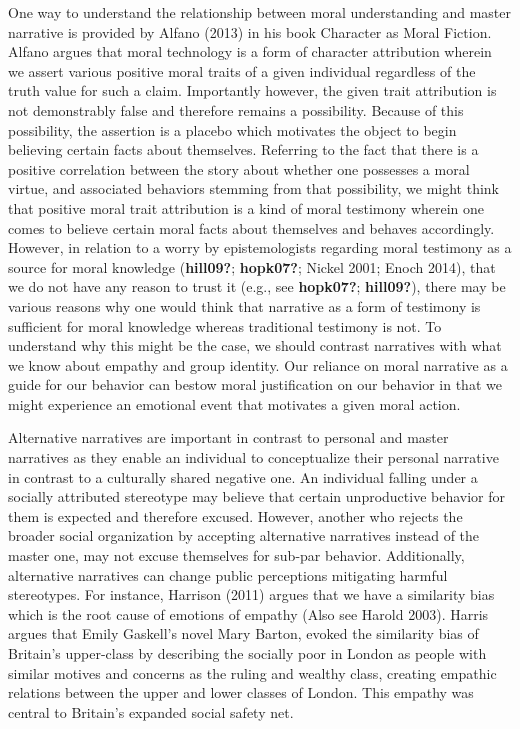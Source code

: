 \documentclass[12pt]{book}
\theoremstyle{definition}
\theoremstyle{remark}
\begin{document}
One way to understand the relationship between moral understanding and master narrative is provided by Alfano (2013) in his book Character as Moral Fiction. Alfano argues that moral technology is a form of character attribution wherein we assert various positive moral traits of a given individual regardless of the truth value for such a claim. Importantly however, the given trait attribution is not demonstrably false and therefore remains a possibility. Because of this possibility, the assertion is a placebo which motivates the object to begin believing certain facts about themselves. Referring to the fact that there is a positive correlation between the story about whether one possesses a moral virtue, and associated behaviors stemming from that possibility, we might think that positive moral trait attribution is a kind of moral testimony wherein one comes to believe certain moral facts about themselves and behaves accordingly. However, in relation to a worry by epistemologists regarding moral testimony as a source for moral knowledge (\textbf{hill09?}; \textbf{hopk07?}; Nickel 2001; Enoch 2014), that we do not have any reason to trust it (e.g., see \textbf{hopk07?}; \textbf{hill09?}), there may be various reasons why one would think that narrative as a form of testimony is sufficient for moral knowledge whereas traditional testimony is not. To understand why this might be the case, we should contrast narratives with what we know about empathy and group identity. Our reliance on moral narrative as a guide for our behavior can bestow moral justification on our behavior in that we might experience an emotional event that motivates a given moral action.

Alternative narratives are important in contrast to personal and master narratives as they enable an individual to conceptualize their personal narrative in contrast to a culturally shared negative one. An individual falling under a socially attributed stereotype may believe that certain unproductive behavior for them is expected and therefore excused. However, another who rejects the broader social organization by accepting alternative narratives instead of the master one, may not excuse themselves for sub-par behavior. Additionally, alternative narratives can change public perceptions mitigating harmful stereotypes. For instance, Harrison (2011) argues that we have a similarity bias which is the root cause of emotions of empathy (Also see Harold 2003). Harris argues that Emily Gaskell's novel Mary Barton, evoked the similarity bias of Britain's upper-class by describing the socially poor in London as people with similar motives and concerns as the ruling and wealthy class, creating empathic relations between the upper and lower classes of London. This empathy was central to Britain's expanded social safety net.
\end{document}
